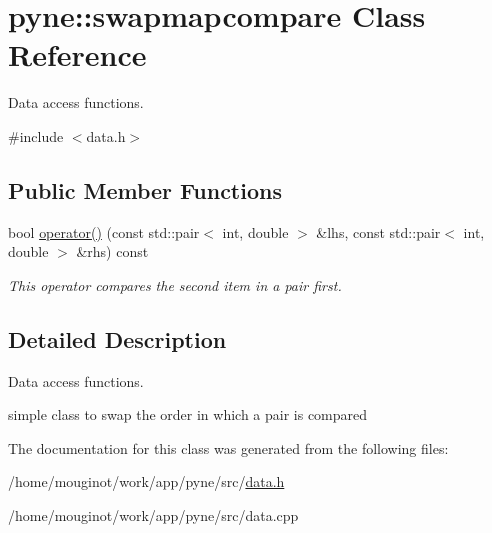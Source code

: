 \hypertarget{classpyne_1_1swapmapcompare}{}\section{pyne\+:\+:swapmapcompare Class Reference}
\label{classpyne_1_1swapmapcompare}


Data access functions.  




{\ttfamily \#include $<$data.\+h$>$}

\subsection*{Public Member Functions}
\begin{DoxyCompactItemize}
\item 
\mbox{\label{classpyne_1_1swapmapcompare_adc68bcf8e84fdc94783114675bb2dd37}} 
bool \hyperlink{classpyne_1_1swapmapcompare_adc68bcf8e84fdc94783114675bb2dd37}{operator()} (const std\+::pair$<$ int, double $>$ \&lhs, const std\+::pair$<$ int, double $>$ \&rhs) const
\begin{DoxyCompactList}\small\item\em This operator compares the second item in a pair first. \end{DoxyCompactList}\end{DoxyCompactItemize}


\subsection{Detailed Description}
Data access functions. 

simple class to swap the order in which a pair is compared 

The documentation for this class was generated from the following files\+:\begin{DoxyCompactItemize}
\item 
/home/mouginot/work/app/pyne/src/\hyperlink{data_8h}{data.\+h}\item 
/home/mouginot/work/app/pyne/src/data.\+cpp\end{DoxyCompactItemize}
